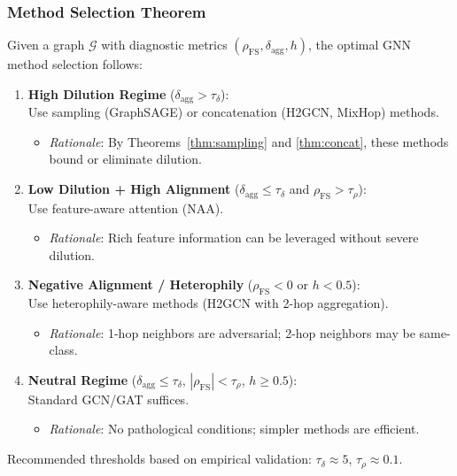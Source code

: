 \subsubsection{Method Selection Theorem}

\begin{theorem}
\label{thm:method_selection}
Given a graph $\mathcal{G}$ with diagnostic metrics $(\rho_{\text{FS}}, \delta_{\text{agg}}, h)$, the optimal GNN method selection follows:

\begin{enumerate}
    \item \textbf{High Dilution Regime} ($\delta_{\text{agg}} > \tau_\delta$): \\
    Use sampling (GraphSAGE) or concatenation (H2GCN, MixHop) methods.
    \begin{itemize}
        \item \textit{Rationale}: By Theorems~\ref{thm:sampling} and \ref{thm:concat}, these methods bound or eliminate dilution.
    \end{itemize}

    \item \textbf{Low Dilution + High Alignment} ($\delta_{\text{agg}} \leq \tau_\delta$ and $\rho_{\text{FS}} > \tau_\rho$): \\
    Use feature-aware attention (NAA).
    \begin{itemize}
        \item \textit{Rationale}: Rich feature information can be leveraged without severe dilution.
    \end{itemize}

    \item \textbf{Negative Alignment / Heterophily} ($\rho_{\text{FS}} < 0$ or $h < 0.5$): \\
    Use heterophily-aware methods (H2GCN with 2-hop aggregation).
    \begin{itemize}
        \item \textit{Rationale}: 1-hop neighbors are adversarial; 2-hop neighbors may be same-class.
    \end{itemize}

    \item \textbf{Neutral Regime} ($\delta_{\text{agg}} \leq \tau_\delta$, $|\rho_{\text{FS}}| < \tau_\rho$, $h \geq 0.5$): \\
    Standard GCN/GAT suffices.
    \begin{itemize}
        \item \textit{Rationale}: No pathological conditions; simpler methods are efficient.
    \end{itemize}
\end{enumerate}

Recommended thresholds based on empirical validation: $\tau_\delta \approx 5$, $\tau_\rho \approx 0.1$.
\end{theorem}

